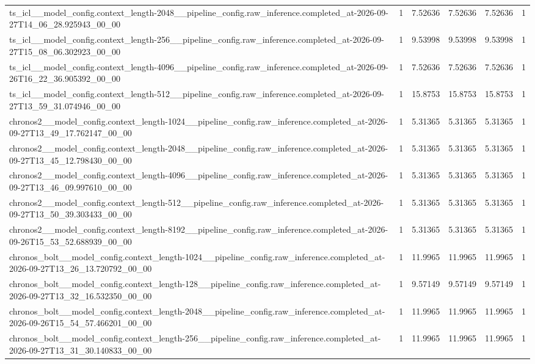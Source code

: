 \begin{tabular}{llllll}
ts\_icl\_\_model\_config.context\_length-2048\_\_pipeline\_config.raw\_inference.completed\_at-2026-09-27T14\_06\_28.925943\_00\_00 & 1 & 7.52636 & 7.52636 & 7.52636 & 1 \\
ts\_icl\_\_model\_config.context\_length-256\_\_pipeline\_config.raw\_inference.completed\_at-2026-09-27T15\_08\_06.302923\_00\_00 & 1 & 9.53998 & 9.53998 & 9.53998 & 1 \\
ts\_icl\_\_model\_config.context\_length-4096\_\_pipeline\_config.raw\_inference.completed\_at-2026-09-26T16\_22\_36.905392\_00\_00 & 1 & 7.52636 & 7.52636 & 7.52636 & 1 \\
ts\_icl\_\_model\_config.context\_length-512\_\_pipeline\_config.raw\_inference.completed\_at-2026-09-27T13\_59\_31.074946\_00\_00 & 1 & 15.8753 & 15.8753 & 15.8753 & 1 \\
chronos2\_\_model\_config.context\_length-1024\_\_pipeline\_config.raw\_inference.completed\_at-2026-09-27T13\_49\_17.762147\_00\_00 & 1 & 5.31365 & 5.31365 & 5.31365 & 1 \\
chronos2\_\_model\_config.context\_length-2048\_\_pipeline\_config.raw\_inference.completed\_at-2026-09-27T13\_45\_12.798430\_00\_00 & 1 & 5.31365 & 5.31365 & 5.31365 & 1 \\
chronos2\_\_model\_config.context\_length-4096\_\_pipeline\_config.raw\_inference.completed\_at-2026-09-27T13\_46\_09.997610\_00\_00 & 1 & 5.31365 & 5.31365 & 5.31365 & 1 \\
chronos2\_\_model\_config.context\_length-512\_\_pipeline\_config.raw\_inference.completed\_at-2026-09-27T13\_50\_39.303433\_00\_00 & 1 & 5.31365 & 5.31365 & 5.31365 & 1 \\
chronos2\_\_model\_config.context\_length-8192\_\_pipeline\_config.raw\_inference.completed\_at-2026-09-26T15\_53\_52.688939\_00\_00 & 1 & 5.31365 & 5.31365 & 5.31365 & 1 \\
chronos\_bolt\_\_model\_config.context\_length-1024\_\_pipeline\_config.raw\_inference.completed\_at-2026-09-27T13\_26\_13.720792\_00\_00 & 1 & 11.9965 & 11.9965 & 11.9965 & 1 \\
chronos\_bolt\_\_model\_config.context\_length-128\_\_pipeline\_config.raw\_inference.completed\_at-2026-09-27T13\_32\_16.532350\_00\_00 & 1 & 9.57149 & 9.57149 & 9.57149 & 1 \\
chronos\_bolt\_\_model\_config.context\_length-2048\_\_pipeline\_config.raw\_inference.completed\_at-2026-09-26T15\_54\_57.466201\_00\_00 & 1 & 11.9965 & 11.9965 & 11.9965 & 1 \\
chronos\_bolt\_\_model\_config.context\_length-256\_\_pipeline\_config.raw\_inference.completed\_at-2026-09-27T13\_31\_30.140833\_00\_00 & 1 & 11.9965 & 11.9965 & 11.9965 & 1 \\

\end{tabular}
